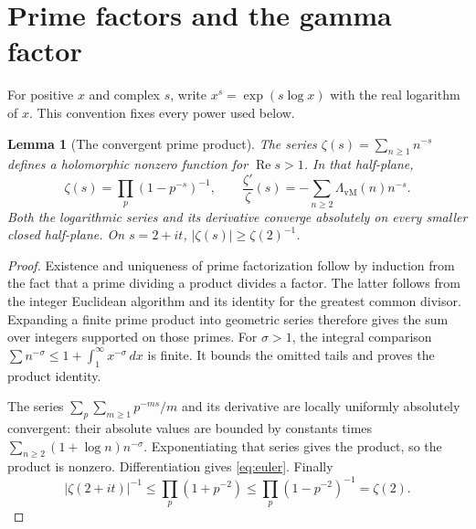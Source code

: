 \documentclass[11pt]{article}
\newtheorem{lemma}[theorem]{Lemma}
\theoremstyle{definition}
\theoremstyle{remark}
\numberwithin{equation}{section}
\begin{document}
\section{Prime factors and the gamma factor}
\label{sec:euler-gamma}

For positive $x$ and complex $s$, write $x^s=\exp(s\log x)$ with the real
logarithm of $x$.  This convention fixes every power used below.

\begin{lemma}[The convergent prime product]
\label{lem:euler}
The series $\zeta(s)=\sum_{n\geq1}n^{-s}$ defines a holomorphic nonzero
function for $\operatorname{Re}s>1$.  In that half-plane,
\begin{equation}
 \zeta(s)=\prod_p(1-p^{-s})^{-1},\qquad
 \frac{\zeta'}{\zeta}(s)=-\sum_{n\geq2}\Lambda_{\mathrm{vM}}(n)n^{-s}.
 \label{eq:euler}
\end{equation}
Both the logarithmic series and its derivative converge absolutely on every
smaller closed half-plane.  On $s=2+it$, $|\zeta(s)|\geq\zeta(2)^{-1}$.
\end{lemma}

\begin{proof}
Existence and uniqueness of prime factorization follow by induction from
the fact that a prime dividing a product divides a factor.  The latter
follows from the integer Euclidean algorithm and its identity for the
greatest common divisor.
Expanding a finite prime product into geometric series therefore gives the
sum over integers supported on those primes.
For $\sigma>1$, the integral comparison
$\sum n^{-\sigma}\leq1+\int_1^\infty x^{-\sigma}\,dx$ is finite.
It bounds the omitted tails and proves the product identity.

The series
$\sum_p\sum_{m\geq1}p^{-ms}/m$ and its derivative are locally uniformly
absolutely convergent: their absolute values are bounded by constants times
$\sum_{n\geq2}(1+\log n)n^{-\sigma}$.
Exponentiating that series gives the product, so the product is nonzero.
Differentiation gives \eqref{eq:euler}.
Finally
\[
 |\zeta(2+it)|^{-1}
 \leq\prod_p(1+p^{-2})\leq\prod_p(1-p^{-2})^{-1}=\zeta(2).
\]
\end{proof}
\end{document}
